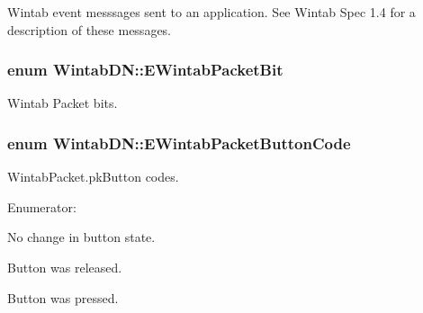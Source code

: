 Wintab event messsages sent to an application. See Wintab Spec 1.4 for a description of these messages. 

\hypertarget{namespace_wintab_d_n_a0244b62cdae8bfd39a52f0656ae7d184}{
\subsubsection[{EWintabPacketBit}]{\setlength{\rightskip}{0pt plus 5cm}enum {\bf WintabDN::EWintabPacketBit}}}
\label{namespace_wintab_d_n_a0244b62cdae8bfd39a52f0656ae7d184}


Wintab Packet bits. 

\hypertarget{namespace_wintab_d_n_a0829e0e054dd601b4f043415c0090c31}{
\subsubsection[{EWintabPacketButtonCode}]{\setlength{\rightskip}{0pt plus 5cm}enum {\bf WintabDN::EWintabPacketButtonCode}}}
\label{namespace_wintab_d_n_a0829e0e054dd601b4f043415c0090c31}


WintabPacket.pkButton codes. 

\begin{Desc}
\item[Enumerator: ]\par
\begin{description}
\item[{\em 
\hypertarget{namespace_wintab_d_n_a0829e0e054dd601b4f043415c0090c31}{
TBN\_\-NONE}
\label{namespace_wintab_d_n_a0829e0e054dd601b4f043415c0090c31}
}]No change in button state. \item[{\em 
\hypertarget{namespace_wintab_d_n_a0829e0e054dd601b4f043415c0090c31}{
TBN\_\-UP}
\label{namespace_wintab_d_n_a0829e0e054dd601b4f043415c0090c31}
}]Button was released. \item[{\em 
\hypertarget{namespace_wintab_d_n_a0829e0e054dd601b4f043415c0090c31}{
TBN\_\-DOWN}
\label{namespace_wintab_d_n_a0829e0e054dd601b4f043415c0090c31}
}]Button was pressed. \end{description}
\end{Desc}

